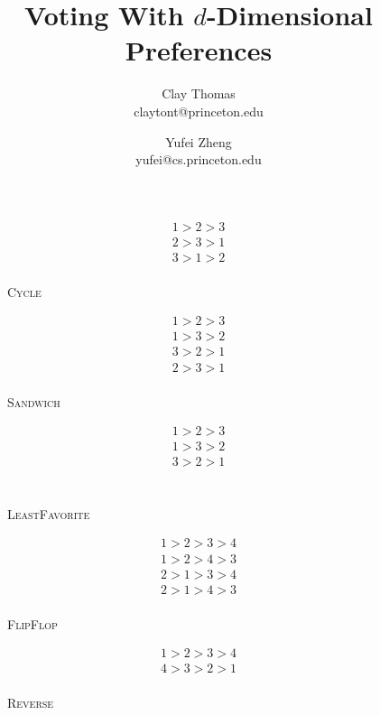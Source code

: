 \documentclass[12pt]{article}
\newcommand{\1}[1]{\mathds{1}[{#1}]}
\begin{document}

\title{
  \vspace{-0.5in}
  Voting With $d$-Dimensional Preferences
}
\date{}
\author{
  Clay Thomas\\
  claytont@princeton.edu 
  \and
  Yufei Zheng\\
  yufei@cs.princeton.edu
}


\maketitle


  \begin{wrapfigure}{r}{0.2\textwidth}
    \begin{center}
      \vspace{-0.5in}
      \begin{align*}
        1 > 2 > 3 \\
        2 > 3 > 1 \\
        3 > 1 > 2 \\
      \end{align*}
      \caption{\textsc{Cycle}}
      \vspace{-0.25in}
      \begin{align*}
        1 > 2 > 3 \\
        1 > 3 > 2 \\
        3 > 2 > 1 \\
        2 > 3 > 1 \\
      \end{align*}
      \caption{\textsc{Sandwich}}
      \vspace{-0.25in}
      \begin{align*}
        1 > 2 > 3 \\
        1 > 3 > 2 \\
        3 > 2 > 1 \\
      \end{align*}
      \caption{\\ \textsc{LeastFavorite}}
      \vspace{-0.25in}
      \begin{align*}
        1 > 2 > 3 > 4 \\
        1 > 2 > 4 > 3 \\
        2 > 1 > 3 > 4 \\
        2 > 1 > 4 > 3 \\
      \end{align*}
      \caption{\textsc{FlipFlop}}
      \vspace{-0.25in}
      \begin{align*}
        1 > 2 > 3 > 4 \\
        4 > 3 > 2 > 1 \\
      \end{align*}
      \caption{\textsc{Reverse}}
    \end{center}
  \end{wrapfigure}
\end{document}
